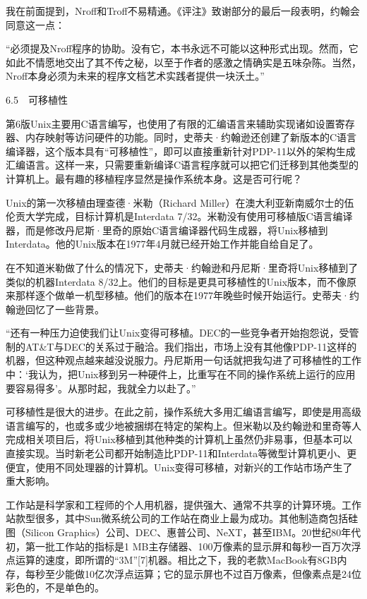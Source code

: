 \documentclass[a4paper,12pt,UTF8,twoside]{ctexbook}
\begin{document}
{{我在前面提到，Nroff和Troff不易精通。《评注》致谢部分的最后一段表明，约翰会同意这一点：

“必须提及Nroff程序的协助。没有它，本书永远不可能以这种形式出现。然而，它如此不情愿地交出了其不传之秘，以至于作者的感激之情确实是五味杂陈。当然，Nroff本身必须为未来的程序文档艺术实践者提供一块沃土。”





6.5　可移植性


第6版Unix主要用C语言编写，也使用了有限的汇编语言来辅助实现诸如设置寄存器、内存映射等访问硬件的功能。同时，史蒂夫·约翰逊还创建了新版本的C语言编译器，这个版本具有“可移植性”，即可以直接重新针对PDP-11以外的架构生成汇编语言。这样一来，只需要重新编译C语言程序就可以把它们迁移到其他类型的计算机上。最有趣的移植程序显然是操作系统本身。这是否可行呢？

Unix的第一次移植由理查德·米勒（Richard Miller）在澳大利亚新南威尔士的伍伦贡大学完成，目标计算机是Interdata 7/32。米勒没有使用可移植版C语言编译器，而是修改丹尼斯·里奇的原始C语言编译器代码生成器，将Unix移植到Interdata。他的Unix版本在1977年4月就已经开始工作并能自给自足了。

在不知道米勒做了什么的情况下，史蒂夫·约翰逊和丹尼斯·里奇将Unix移植到了类似的机器Interdata 8/32上。他们的目标是更具可移植性的Unix版本，而不像原来那样逐个做单一机型移植。他们的版本在1977年晚些时候开始运行。史蒂夫·约翰逊回忆了一些背景。

“还有一种压力迫使我们让Unix变得可移植。DEC的一些竞争者开始抱怨说，受管制的AT\&T与DEC的关系过于融洽。我们指出，市场上没有其他像PDP-11这样的机器，但这种观点越来越没说服力。丹尼斯用一句话就把我勾进了可移植性的工作中：‘我认为，把Unix移到另一种硬件上，比重写在不同的操作系统上运行的应用要容易得多’。从那时起，我就全力以赴了。”



可移植性是很大的进步。在此之前，操作系统大多用汇编语言编写，即使是用高级语言编写的，也或多或少地被捆绑在特定的架构上。但米勒以及约翰逊和里奇等人完成相关项目后，将Unix移植到其他种类的计算机上虽然仍非易事，但基本可以直接实现。当时新老公司都开始制造比PDP-11和Interdata等微型计算机更小、更便宜，使用不同处理器的计算机。Unix变得可移植，对新兴的工作站市场产生了重大影响。

工作站是科学家和工程师的个人用机器，提供强大、通常不共享的计算环境。工作站款型很多，其中Sun微系统公司的工作站在商业上最为成功。其他制造商包括硅图（Silicon Graphics）公司、DEC、惠普公司、NeXT，甚至IBM。20世纪80年代初，第一批工作站的指标是1 MB主存储器、100万像素的显示屏和每秒一百万次浮点运算的速度，即所谓的“3M”[7]机器。相比之下，我的老款MacBook有8GB内存，每秒至少能做10亿次浮点运算；它的显示屏也不过百万像素，但像素点是24位彩色的，不是单色的。

}}
\end{document}
